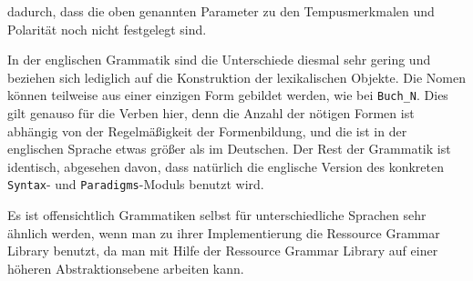 dadurch, dass die oben genannten Parameter zu den Tempusmerkmalen und Polarität noch nicht festgelegt sind.\par

In der englischen Grammatik sind die Unterschiede diesmal sehr gering und beziehen sich lediglich auf die Konstruktion der lexikalischen Objekte. Die Nomen können teilweise aus einer einzigen Form gebildet werden, wie bei \texttt{Buch\_N}. Dies gilt genauso für die Verben hier, denn die Anzahl der nötigen Formen ist abhängig von der Regelmäßigkeit der Formenbildung, und die ist in der englischen Sprache etwas größer als im Deutschen. Der Rest der Grammatik ist identisch, abgesehen davon, dass natürlich die englische Version des konkreten \texttt{Syntax}- und \texttt{Paradigms}-Moduls benutzt wird. \par
Es ist offensichtlich Grammatiken selbst für unterschiedliche Sprachen sehr ähnlich werden, wenn man zu ihrer Implementierung die Ressource Grammar Library benutzt, da man mit Hilfe der Ressource Grammar Library auf einer höheren Abstraktionsebene arbeiten kann.